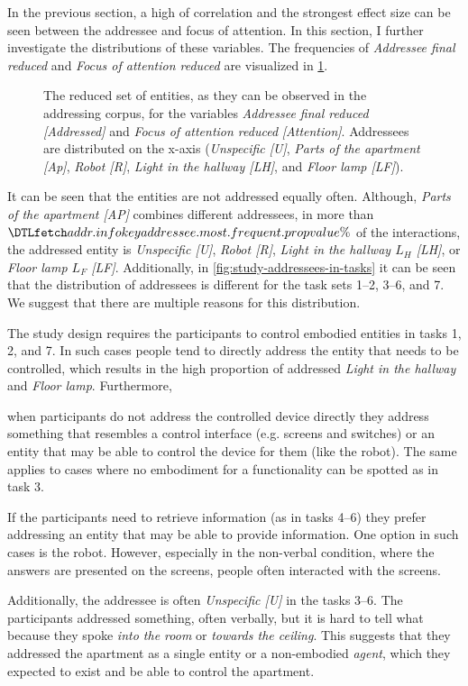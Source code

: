 In the previous section, a high of correlation and the strongest effect size can be seen between the \gls{addressee} and focus of attention.
In this section, I further investigate the distributions of these variables.
The frequencies of \emph{Addressee final reduced} and \emph{Focus of attention reduced} are visualized in \cref{fig:study-addressee-addressees}.
\begin{figure}[tbh]
  \centering
  
    \caption[Addressee usage in the addressing corpus.]{\label{fig:study-addressee-addressees} 
    The reduced set of entities, as they can be observed in the \gls{addressing corpus}, for the variables \emph{Addressee final reduced} \emph{[Addressed]}  and \emph{Focus of attention reduced} \emph{[Attention]}.
    Addressees are distributed on the x-axis (\emph{Unspecific [U]}, \emph{Parts of the apartment [Ap]}, \emph{Robot [R]}, \emph{Light in the hallway [LH]}, and \emph{Floor lamp [LF]}).
    }
\end{figure}
It can be seen that the entities are not addressed equally often. 
Although, \emph{Parts of the apartment [AP]} combines different \glspl{addressee}, in more than \(\inidata{addr.info}{addressee.most.frequent.prop}\%\) of the interactions, the addressed entity is \emph{Unspecific [U]}, \emph{Robot [R]}, \emph{Light in the hallway \(L_H\) [LH]}, or \emph{Floor lamp \(L_F\) [LF]}.
Additionally, in \cref{fig:study-addressees-in-tasks} it can be seen that the distribution of \glspl{addressee} is different for the task sets 1--2, 3--6, and 7.
We \cite{Bernotat2016} suggest that there are multiple reasons for this distribution.
\begin{enumerate*}[label=(\roman*)]
    \item The study design requires the participants to control embodied entities in tasks 1, 2, and 7.
    In such cases people tend to directly address the entity that needs to be controlled, which results in the high proportion of addressed \emph{Light in the hallway} and \emph{Floor lamp}.
    Furthermore,
    \item when participants do not address the controlled \gls{device} directly they address something that resembles a control interface (e.g. screens and switches) or an entity that may be able to control the \gls{device} for them (like the robot).
    The same applies to cases where no embodiment for a functionality can be spotted as in task 3.
    \item If the participants need to retrieve information (as in tasks 4--6) they prefer addressing an entity that may be able to provide information.
    One option in such cases is the \gls{robot}.
    However, especially in the non-verbal condition, where the answers are presented on the screens, people often interacted with the screens.
\end{enumerate*}
Additionally, the \gls{addressee} is often \emph{Unspecific [U]} in the tasks 3--6.
The participants addressed something, often verbally, but it is hard to tell what because they spoke \emph{into the room} or \emph{towards the ceiling}.
This suggests that they addressed the \gls{apartment} as a single entity or a non-embodied \emph{agent}, which they expected to exist and be able to control the \gls{apartment}.

